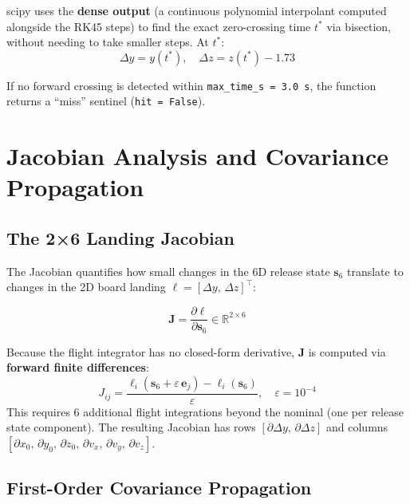 \documentclass[11pt,letterpaper]{article}
\begin{document}
scipy uses the \textbf{dense output} (a continuous polynomial interpolant computed alongside the RK45 steps) to find the exact zero-crossing time $t^*$ via bisection, without needing to take smaller steps. At $t^*$:
\begin{equation}
  \Delta y = y(t^*), \quad \Delta z = z(t^*) - 1.73
\end{equation}

If no forward crossing is detected within \texttt{max\_time\_s = 3.0 s}, the function returns a ``miss'' sentinel (\texttt{hit = False}).

\section{Jacobian Analysis and Covariance Propagation}

\subsection{The 2×6 Landing Jacobian}

The Jacobian quantifies how small changes in the 6D release state $\bm{s}_6$ translate to changes in the 2D board landing $\bm{\ell} = [\Delta y,\, \Delta z]^\top$:

\begin{equation}
  \mathbf{J} = \frac{\partial \bm{\ell}}{\partial \bm{s}_6} \in \mathbb{R}^{2 \times 6}
\end{equation}

Because the flight integrator has no closed-form derivative, $\mathbf{J}$ is computed via \textbf{forward finite differences}:
\begin{equation}
  J_{ij} = \frac{\ell_i(\bm{s}_6 + \varepsilon\,\bm{e}_j) - \ell_i(\bm{s}_6)}{\varepsilon}, \quad \varepsilon = 10^{-4}
\end{equation}
This requires 6 additional flight integrations beyond the nominal (one per release state component). The resulting Jacobian has rows $[\partial\Delta y,\, \partial\Delta z]$ and columns $[\partial x_0,\, \partial y_0,\, \partial z_0,\, \partial v_x,\, \partial v_y,\, \partial v_z]$.

\subsection{First-Order Covariance Propagation}
\end{document}
